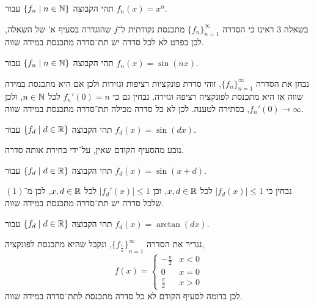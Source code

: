 \subquestion{}
תהי הקבוצה $\{ f_n \mid n \in \mathbb{N} \}$ עבור $f_n(x) = x^n$.
\begin{solution}
	בשאלה 3 ראינו כי הסדרה ${\{ f_n \}}_{n = 1}^\infty$ מתכנסת נקודתית ל־$f$ שהוגדרה בסעיף א' של השאלה, לכן בפרט לא לכל סדרה יש תת־סדרה מתכנסת במידה שווה.
\end{solution}

\subquestion{}
תהי הקבוצה $\{ f_n \mid n \in \mathbb{N} \}$ עבור $f_n(x) = \sin(nx)$.
\begin{solution}
	נבחן את הסדרה ${\{ f_n \}}_{n = 1}^\infty$, זוהי סדרת פונקציות רציפות וגזירות ולכן אם היא מתכנסת במידה שווה אז היא מתכנסת לפונקציה רציפה וגזירה.
	נבחין גם כי $f_n'(0) = n$ לכל $n \in \mathbb{N}$, ולכן $f_n'(0) \to \infty$, בסתירה לטענה.
	לכן לא כל סדרה מכילה תת־סדרה מתכנסת במידה שווה.
\end{solution}

\subquestion{}
תהי הקבוצה $\{ f_d \mid d \in \mathbb{R} \}$ עבור $f_d(x) = \sin(dx)$.
\begin{solution}
	נובע מהסעיף הקודם שאין, על־ידי בחירת אותה סדרה.
\end{solution}

\subquestion{}
תהי הקבוצה $\{ f_d \mid d \in \mathbb{R} \}$ עבור $f_d(x) = \sin(x + d)$.
\begin{solution}
	נבחין כי $|f_d(x)| \le 1$ לכל $x, d \in \mathbb{R}$, וכן $|f_d'(x)| \le 1$ לכל $x, d \in \mathbb{R}$, לכן מ־$(1)$ שלכל סדרה יש תת־סדרה מתכנסת במידה שווה.
\end{solution}

\subquestion{}
תהי הקבוצה $\{ f_d \mid d \in \mathbb{R} \}$ עבור $f_d(x) = \arctan(dx)$.
\begin{solution}
	נגדיר את הסדרה ${\{ f_{\frac{1}{n}} \}}_{n = 1}^\infty$, ונקבל שהיא מתכנסת לפונקציה,
	\[
		f(x)
		= \begin{cases}
			-\frac{\pi}{2} & x < 0 \\
			0 & x = 0 \\
			\frac{\pi}{2} & x > 0
		\end{cases}
	\]
	לכן בדומה לסעיף הקודם לא כל סדרה מתכנסת לתת־סדרה במידה שווה.
\end{solution}


